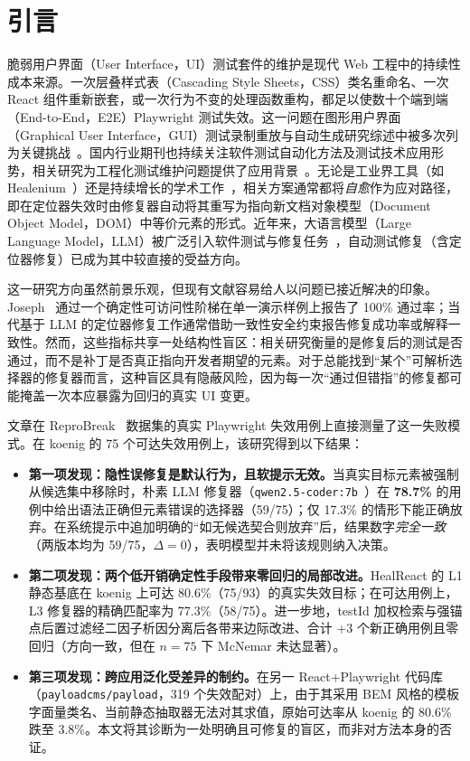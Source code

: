 \section{引言}
\label{sec:intro}

脆弱用户界面（User Interface，UI）测试套件的维护是现代 Web 工程中的持续性成本来源。一次层叠样式表（Cascading Style Sheets，CSS）类名重命名、一次 React 组件重新嵌套，或一次行为不变的处理函数重构，都足以使数十个端到端（End-to-End，E2E）Playwright 测试失效。这一问题在图形用户界面（Graphical User Interface，GUI）测试录制重放与自动生成研究综述中被多次列为关键挑战~\cite{li2022androidReplay, wang2025mobileGui}。国内行业期刊也持续关注软件测试自动化方法及测试技术应用形势，相关研究为工程化测试维护问题提供了应用背景~\cite{yang2017wirelessAutoTest, liu2022wirelessTesting}。无论是工业界工具（如 Healenium~\cite{healenium}）还是持续增长的学术工作~\cite{joseph2026zerocost, mouraReproBreak2026}，相关方案通常都将\emph{自愈}作为应对路径，即在定位器失效时由修复器自动将其重写为指向新文档对象模型（Document Object Model，DOM）中等价元素的形式。近年来，大语言模型（Large Language Model，LLM）被广泛引入软件测试与修复任务~\cite{xiang2025llmRepair, li2025llmFuzzing}，自动测试修复（含定位器修复）已成为其中较直接的受益方向。

这一研究方向虽然前景乐观，但现有文献容易给人以问题已接近解决的印象。Joseph~\cite{joseph2026zerocost} 通过一个确定性可访问性阶梯在单一演示样例上报告了 100\% 通过率；当代基于 LLM 的定位器修复工作通常借助一致性安全约束报告修复成功率或解释一致性。然而，这些指标共享一处结构性盲区：相关研究衡量的是修复后的测试是否通过，而不是补丁是否真正指向开发者期望的元素。对于总能找到“某个”可解析选择器的修复器而言，这种盲区具有隐蔽风险，因为每一次“通过但错指”的修复都可能掩盖一次本应暴露为回归的真实 UI 变更。

文章在 ReproBreak~\cite{mouraReproBreak2026} 数据集的真实 Playwright 失效用例上直接测量了这一失败模式。在 koenig 的 75 个可达失效用例上，该研究得到以下结果：

\begin{itemize}
\item \textbf{第一项发现：隐性误修复是默认行为，且软提示无效。}当真实目标元素被强制从候选集中移除时，朴素 LLM 修复器（\texttt{qwen2.5-coder:7b}~\cite{qwenCoderTech2024}）在 \textbf{78.7\%} 的用例中给出语法正确但元素错误的选择器（59/75）；仅 17.3\% 的情形下能正确放弃。在系统提示中追加明确的“如无候选契合则放弃”后，结果数字\emph{完全一致}（两版本均为 59/75，$\Delta=0$），表明模型并未将该规则纳入决策。
\item \textbf{第二项发现：两个低开销确定性手段带来零回归的局部改进。}HealReact 的 L1 静态基底在 koenig 上可达 80.6\%（75/93）的真实失效目标；在可达用例上，L3 修复器的精确匹配率为 77.3\%（58/75）。进一步地，testId 加权检索与强锚点后置过滤经二因子析因分离后各带来边际改进、合计 +3 个新正确用例且零回归（方向一致，但在 $n=75$ 下 McNemar 未达显著）。
\item \textbf{第三项发现：跨应用泛化受差异的制约。}在另一 React+Playwright 代码库（\texttt{payloadcms/payload}，319 个失效配对）上，由于其采用 BEM 风格的模板字面量类名、当前静态抽取器无法对其求值，原始可达率从 koenig 的 80.6\% 跌至 3.8\%。本文将其诊断为一处明确且可修复的盲区，而非对方法本身的否证。
\end{itemize}

